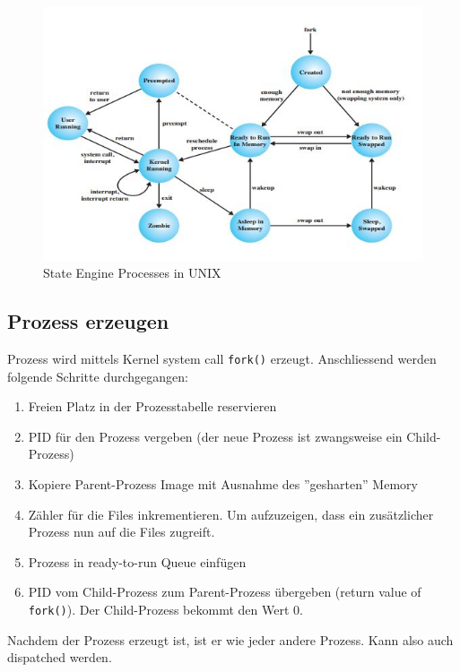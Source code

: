 \begin{figure}[h!]
	\centering
	\includegraphics[width=0.9\linewidth]{fig/system-software-state-engine-processes-unix}
	\caption{State Engine Processes in UNIX}
	\label{fig:system-software-state-engine-processes-unix}
\end{figure}

\newpage

\subsection{Prozess erzeugen}
Prozess wird mittels Kernel system call \texttt{fork()} erzeugt. Anschliessend werden folgende Schritte durchgegangen:
\begin{enumerate}
	\item Freien Platz in der Prozesstabelle reservieren
	\item PID für den Prozess vergeben (der neue Prozess ist zwangsweise ein Child-Prozess)
	\item Kopiere Parent-Prozess Image mit Ausnahme des ''gesharten'' Memory
	\item Zähler für die Files inkrementieren. Um aufzuzeigen, dass ein zusätzlicher Prozess nun auf die Files zugreift.
	\item Prozess in ready-to-run Queue einfügen
	\item PID vom Child-Prozess zum Parent-Prozess übergeben (return value of \texttt{fork()}). Der Child-Prozess bekommt den Wert 0.
\end{enumerate}
Nachdem der Prozess erzeugt ist, ist er wie jeder andere Prozess. Kann also auch dispatched werden.

